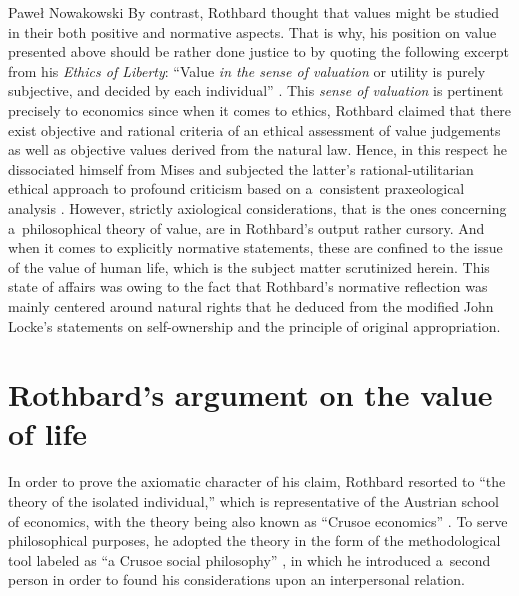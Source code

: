 \begin{artengenv}{Paweł Nowakowski}
By contrast, Rothbard thought that values might be studied in their both positive and normative aspects. That is why, his position on value presented above should be rather done justice to by quoting the following excerpt from his \textit{Ethics of Liberty}: ``Value \textit{in the sense of valuation} or utility is purely subjective, and decided by each individual'' 
\parencite[][italics added]{Rothbard1998Ethics}. %
 This \textit{sense of valuation} is pertinent precisely to economics since when it comes to ethics, Rothbard 
\parencites*[][p.78]{Rothbard1997Praxeology}[][p.12]{Rothbard1998Ethics} %
 claimed that there exist objective and rational criteria of an ethical assessment of value judgements as well as objective values derived from the natural law. Hence, in this respect he dissociated himself from Mises and subjected the latter's rational-utilitarian ethical approach to profound criticism based on a~consistent praxeological analysis 
\parencites[see][pp.90–99]{Rothbard1997Praxeology}[][pp.201–214]{Rothbard1998Ethics}. %
 However, strictly axiological considerations, that is the ones concerning a~philosophical theory of value, are in Rothbard's output rather cursory. And when it comes to explicitly normative statements, these are confined to the issue of the value of human life, which is the subject matter scrutinized herein. This state of affairs was owing to the fact that Rothbard's normative reflection was mainly centered around natural rights that he deduced from the modified John Locke's statements on self-ownership and the principle of original appropriation.



\section{Rothbard's argument on the value of life}

In order to prove the axiomatic character of his claim, Rothbard 
\parencites*[][p.946]{Rothbard1951Praxeology}[see also][ch.~1-2]{Rothbard2009Man} %
 resorted to ``the theory of the isolated individual,'' which is representative of the Austrian school of economics, with the theory being also known as ``Crusoe economics'' 
\parencite[see][pp.353–392]{Nozick1977On}. %
 To serve philosophical purposes, he adopted the theory in the form of the methodological tool labeled as ``a Crusoe social philosophy'' 
\parencite[see][pp.29–34]{Rothbard1998Ethics}, %
 in which he introduced a~second person in order to found his considerations upon an interpersonal relation.




\end{artengenv}

